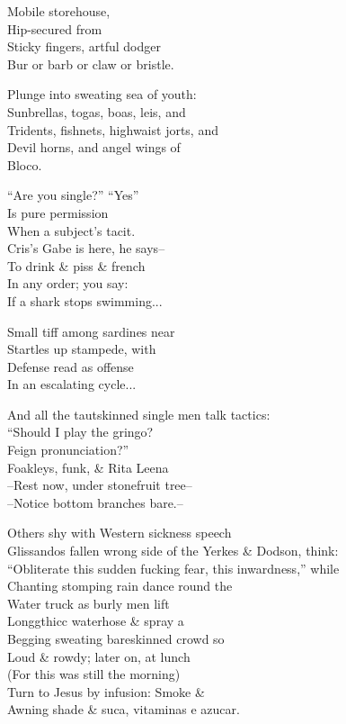 Mobile storehouse, \\
Hip-secured from \\
Sticky fingers, artful dodger \\
Bur or barb or claw or bristle.

Plunge into sweating sea of youth: \\
Sunbrellas, togas, boas, leis, and \\
Tridents, fishnets, highwaist jorts, and \\
Devil horns, and angel wings of \\
Bloco. 

``Are you single?'' ``Yes'' \\
Is pure permission \\
When a subject's tacit. \\
Cris's Gabe is here, he says-- \\
To drink \& piss \& french \\
In any order; you say: \\
If a shark stops swimming...

Small tiff among sardines near \\
Startles up stampede, with \\
Defense read as offense \\
In an escalating cycle...

And all the tautskinned single men talk tactics: \\
``Should I play the gringo? \\
Feign pronunciation?'' \\
Foakleys, funk, \& Rita Leena \\

--Rest now, under stonefruit tree-- \\
--Notice bottom branches bare.--

Others shy with Western sickness speech \\
Glissandos fallen wrong side of the Yerkes \& Dodson, think: \\
``Obliterate this sudden fucking fear, this inwardness,'' while \\
Chanting stomping rain dance round the \\
Water truck as burly men lift \\
Longgthicc waterhose \& spray a \\
Begging sweating bareskinned crowd so \\
Loud \& rowdy; later on, at lunch \\
(For this was still the morning) \\
Turn to Jesus by infusion: Smoke \& \\
Awning shade \& suca, vitaminas e azucar. 